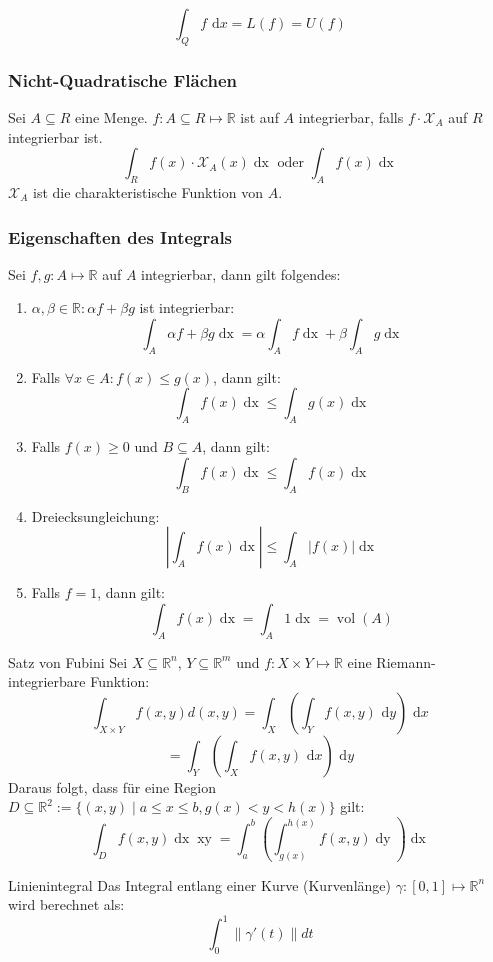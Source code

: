 \documentclass[a4paper,10pt]{article}
\def\R{\mathbb{R}}
\def\X{\mathcal{X}}
\def\dx{\text{ d}x}
\def\dy{\text{ d}y}
\DeclareMathOperator{\vol}{\text{vol}}
\begin{document}
$$ \int_Q f \dx = L(f) = U(f) $$

\subsubsection*{Nicht-Quadratische Flächen}
Sei \(A \subseteq R\) eine Menge. \(f : A \subseteq R \mapsto \R\) ist auf \(A\) integrierbar, falls \(f \cdot \X_A\) auf \(R\) integrierbar ist. 
\[\int_R f(x) \cdot \X_A(x) \mathop{dx} \text{ oder } \int_A f(x) \mathop{dx}\]
\(\X_A\) ist die charakteristische Funktion von \(A\).

\subsubsection*{Eigenschaften des Integrals}
Sei \(f,g : A \mapsto \R\) auf \(A\) integrierbar, dann gilt folgendes:
\begin{enumerate}
  \item \(\alpha, \beta \in \R: \alpha f + \beta g\) ist integrierbar:
  \[\int_A \alpha f + \beta g \mathop{dx} = \alpha \int_A f \mathop{dx} + \beta \int_A g \mathop{dx}\]
  \item Falls \(\forall x \in A: f(x) \le g(x)\), dann gilt:
  \[\int_A f(x) \mathop{dx} \le \int_A g(x) \mathop{dx}\]
  \item Falls \(f(x) \ge 0\) und \(B \subseteq A\), dann gilt:
  \[\int_B f(x) \mathop{dx} \le \int_A f(x) \mathop{dx}\]
  \item Dreiecksungleichung:
    \[\left| \int_A f(x) \mathop{dx}\right| \le \int_A \left|f(x)\right| \mathop{dx}\]
  \item Falls \(f = 1\), dann gilt:
  \[\int_A f(x) \mathop{dx} = \int_A 1 \mathop{dx} = \vol(A)\]
\end{enumerate}


\begin{mainbox}{Satz von Fubini}
  Sei $X \subseteq \R^n$, $Y \subseteq \R^m$ und $f: X \times Y \mapsto \R$ eine Riemann-integrierbare Funktion:
  $$\int_{X \times Y} f(x, y) d(x, y) = \int_X \left( \int_Y f(x,y) \dy \right) \dx$$
  $$= \int_Y \left( \int_X f(x,y) \dx \right) \dy$$
  Daraus folgt, dass für eine Region \(D \subseteq \R^2 := \{\left(x,y\right) \mid a \le x \le b, g(x) < y < h(x)\}\) gilt:
  \[\int_D f(x,y)\mathop{dx} \mathop{xy} = \int_a^b \left(\int_{g(x)}^{h(x)} f(x,y) \mathop{dy}\right)\mathop{dx}\]
\end{mainbox}

\begin{subbox}{Linienintegral}
  Das Integral entlang einer Kurve (Kurvenlänge) $\gamma: [0, 1] \mapsto \R^n$ wird berechnet als:
  $$\int_0^1 \lVert \gamma'(t) \rVert dt$$
\end{subbox}
\end{document}
